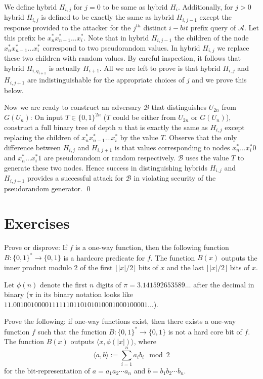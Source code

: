 We define hybrid $H_{i,j}$ for $j =0$ to be same as hybrid $H_{i}$. Additionally, for $j >0$ hybrid $H_{i,j}$ is defined to be exactly the same as hybrid $H_{i,j-1}$ except the response provided to the attacker for the $j^{th}$ distinct $i-bit$ prefix query of $\mathcal{A}$. Let this prefix be $x^*_n x^*_{n-1} \ldots x^*_{i}$. Note that in hybrid $H_{i,j-1}$ the children of the node $x^*_n x^*_{n-1} \ldots x^*_{i}$ correspond to two pseudorandom values. In hybrid $H_{i,j}$ we replace these two children with random values. By careful inspection, it follows that hybrid $H_{i,q_{i+1}}$ is actually $H_{i+1}$. All we are left to prove is that hybrid $H_{i,j}$ and $H_{i,j+1}$ are indistinguishable for the appropriate choices of $j$ and we prove this below.


Now we are ready to construct an adversary $\mathcal{B}$ that  distinguishes $U_{2n}$ from $G(U_n)$: On input $T \in\{0, 1\}^{2n}$ ($T$ could be either from $U_{2n}$ or $G(U_n)$),
construct a full binary tree of depth $n$ that is exactly the same as $H_{i,j}$ except replacing the children of  $x^*_n x^*_{n-1} \ldots x^*_{i}$ by the value $T$.
Observe that the only difference between $H_{i,j}$ and $H_{i,j+1}$ is that values corresponding to nodes $x_n^*\ldots x_i^* 0$ and $x_n^*\ldots x_i^* 1$ are pseudorandom or random respectively. $\mathcal{B}$ uses the value $T$ to generate these two nodes. Hence success in  distinguishing hybrids $H_{i,j}$ and $H_{i,j+1}$ provides a successful attack for $\mathcal{B}$ in violating security of the pseudorandom generator.
\qed

\section*{Exercises}
\begin{exercise}
\newcommand{\bit}{\{0,1\}}

Prove or disprove: If $f$ is a one-way function, then the following function $B:\bit^*\to\bit$ is a hardcore predicate for $f$. The function $B(x)$ outputs the inner product modulo 2 of the first $\lfloor |x|/2\rfloor$ bits of $x$ and the last $\lfloor |x|/2\rfloor$ bits of $x$.
\end{exercise}

\begin{exercise}
Let $\phi(n)$ denote the first $n$ digits of $\pi = 3.141592653589\ldots$ after the decimal in binary ($\pi$ in its binary notation looks like $11.00100100001111110110101010001000100001\ldots$).

   Prove the following: if one-way functions exist, then there exists a one-way function $f$ such that the function $B:\{0,1\}^* \rightarrow \{0,1\}$ is not a hard core bit of $f$. The function $B(x)$ outputs $\langle x, \phi(|x|)\rangle$, where
    \[\langle a, b\rangle := \sum_{i=1}^n a_i b_i \mod 2\]
    for the bit-representation of $a = {a_1a_2\cdots a_n}$ and $b= {b_1b_2\cdots b_n}$.
\end{exercise}

